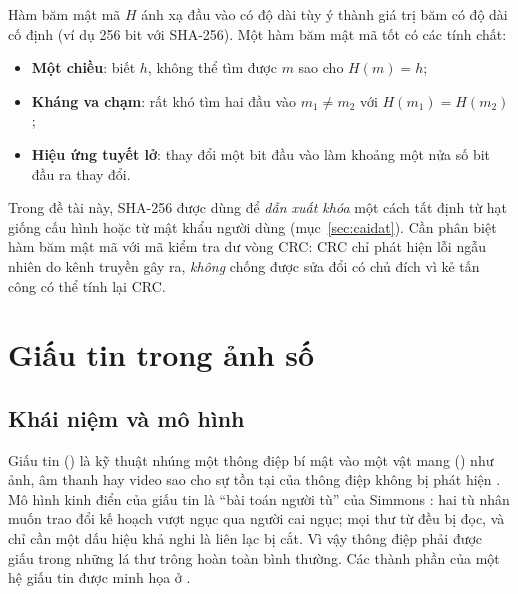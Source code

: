 Hàm băm mật mã $H$ ánh xạ đầu vào có độ dài tùy ý thành giá trị băm có độ dài cố định
(ví dụ 256 bit với SHA-256). Một hàm băm mật mã tốt có các tính chất:
\begin{itemize}
  \item \textbf{Một chiều}: biết $h$, không thể tìm được $m$ sao cho $H(m) = h$;
  \item \textbf{Kháng va chạm}: rất khó tìm hai đầu vào $m_1 \neq m_2$ với $H(m_1) = H(m_2)$;
  \item \textbf{Hiệu ứng tuyết lở}: thay đổi một bit đầu vào làm khoảng một nửa số bit đầu ra
        thay đổi.
\end{itemize}
Trong đề tài này, SHA-256 được dùng để \emph{dẫn xuất khóa} một cách tất định từ hạt giống
cấu hình hoặc từ mật khẩu người dùng (mục~\ref{sec:caidat}). Cần phân biệt hàm băm mật mã với
mã kiểm tra dư vòng CRC: CRC chỉ phát hiện lỗi ngẫu nhiên do kênh truyền gây ra, \emph{không}
chống được sửa đổi có chủ đích vì kẻ tấn công có thể tính lại CRC.

\section{Giấu tin trong ảnh số}
\label{sec:giautin}

\subsection{Khái niệm và mô hình}

Giấu tin () là kỹ thuật nhúng một thông điệp bí mật vào một vật mang
() như ảnh, âm thanh hay video sao cho sự tồn tại của thông điệp không bị phát
hiện \cite{johnson1998, cheddad2010}. Mô hình kinh điển của giấu tin là ``bài toán người tù''
của Simmons \cite{simmons1984}: hai tù nhân muốn trao đổi kế hoạch vượt ngục qua người cai
ngục; mọi thư từ đều bị đọc, và chỉ cần một dấu hiệu khả nghi là liên lạc bị cắt. Vì vậy
thông điệp phải được giấu trong những lá thư trông hoàn toàn bình thường. Các thành phần của
một hệ giấu tin được minh họa ở .

